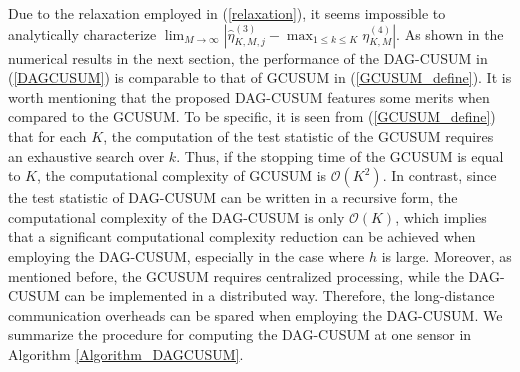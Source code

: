\documentclass[11pt, draftclsnofoot, onecolumn]{IEEEtran}
\newcommand{\cO}{\mathcal{O}}
\begin{document}
Due to the relaxation employed in (\ref{relaxation}), it seems impossible to analytically characterize ${\lim }_{M \to \infty } | {\hat \eta _{K,M,j}^{(3)}} -  {\max }_{1 \le k \le K} \eta _{K,M}^{(4)} |$. As shown in the numerical results in the next section, the performance of the DAG-CUSUM in (\ref{DAGCUSUM}) is comparable to that of GCUSUM in (\ref{GCUSUM_define}).
It is worth mentioning that the proposed DAG-CUSUM features some merits when compared to the GCUSUM. To be specific, it is seen from (\ref{GCUSUM_define}) that for each $K$, the computation of the test statistic of the GCUSUM requires an exhaustive search over $k$. Thus, if the stopping time of the GCUSUM is equal to $K$, the computational complexity of GCUSUM is $\cO(K^2)$. In contrast, since the test statistic of DAG-CUSUM can be written in a recursive form, the computational complexity of the DAG-CUSUM is only $\cO(K)$, which implies that a significant computational complexity reduction can be achieved when employing the DAG-CUSUM, especially in the case where $h$ is large. Moreover, as mentioned before, the GCUSUM requires centralized processing, while the DAG-CUSUM can be implemented in a distributed way. Therefore, the long-distance communication overheads can be spared when employing the DAG-CUSUM. 
We summarize the procedure for computing the DAG-CUSUM at one sensor in Algorithm \ref{Algorithm_DAGCUSUM}.
\end{document}
